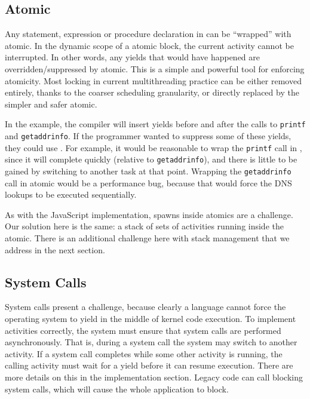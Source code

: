 \documentclass[acmsmall,anonymous,review]{acmart}\settopmatter{printfolios=true,printccs=false,printacmref=false}
\begin{document}
\subsection{Atomic}
\label{sec:atomic}

Any statement, expression or procedure declaration in \charcoal{} can be ``wrapped'' with atomic.
In the dynamic scope of a atomic block, the current activity cannot be interrupted.
In other words, any yields that would have happened are overridden/suppressed by atomic.
This is a simple and powerful tool for enforcing atomicity.
Most locking in current multithreading practice can be either removed entirely, thanks to the coarser scheduling granularity, or directly replaced by the simpler and safer atomic.

In the example, the compiler will insert yields before and after the calls to \texttt{printf} and \texttt{getaddrinfo}.
If the programmer wanted to suppress some of these yields, they could use \atomic{}.
For example, it would be reasonable to wrap the \texttt{printf} call in \atomic{}, since it will complete quickly (relative to \texttt{getaddrinfo}), and there is little to be gained by switching to another task at that point.
Wrapping the \texttt{getaddrinfo} call in atomic would be a performance bug, because that would force the DNS lookups to be executed sequentially.

As with the JavaScript implementation, spawns inside atomics are a challenge.
Our solution here is the same: a stack of sets of activities running inside the atomic.
There is an additional challenge here with stack management that we address in the next section.

\subsection{System Calls}

System calls present a challenge, because clearly a language cannot force the operating system to yield in the middle of kernel code execution.
To implement activities correctly, the system must ensure that system calls are performed asynchronously.
That is, during a system call the system may switch to another activity.
If a system call completes while some other activity is running, the calling activity must wait for a yield before it can resume execution.
There are more details on this in the implementation section.
Legacy code can call blocking system calls, which will cause the whole application to block.
\end{document}
